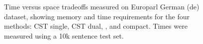\begin{figure}[tb]

\caption{Time versus space tradeoffs measured on Europarl German (de) dataset, showing memory and time requirements for the four methods: CST single, CST dual, \SRILM, and \SRILM compact. Times were measured using a 10k sentence test set.}
\label{fig:spacetime}
\end{figure}





